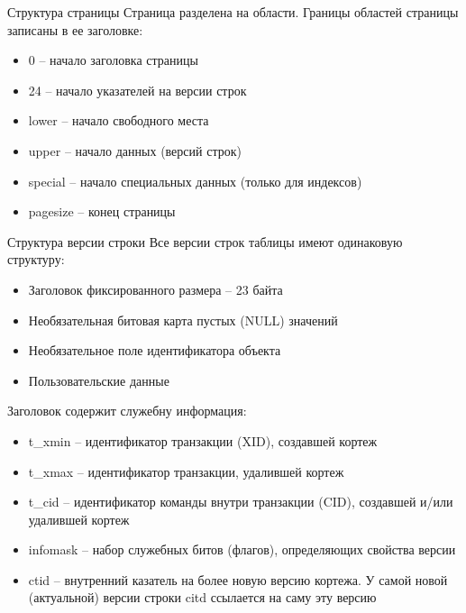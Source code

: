 \documentclass[12pt]{article}
\begin{document}
\begin{nota}{Структура страницы}
    Страница разделена на области. Границы областей страницы записаны в ее заголовке:

    \begin{itemize}
        \item 0 -- начало заголовка страницы 
        \item 24 -- начало указателей на версии строк 
        \item lower -- начало свободного места 
        \item upper -- начало данных (версий строк)
        \item special -- начало специальных данных (только для индексов)
        \item pagesize -- конец страницы
    \end{itemize}
\end{nota}

\begin{nota}{Структура версии строки}
    Все версии строк таблицы имеют одинаковую структуру: 

    \begin{itemize}
        \item Заголовок фиксированного размера -- 23 байта 
        \item Необязательная битовая карта пустых (NULL) значений 
        \item Необязательное поле идентификатора объекта 
        \item Пользовательские данные 
    \end{itemize}

    Заголовок содержит служебну информация:

    \begin{itemize}
        \item t\_xmin -- идентификатор транзакции (XID), создавшей кортеж 
        \item t\_xmax -- идентификатор транзакции, удалившей кортеж
        \item t\_cid -- идентификатор команды внутри транзакции (CID), создавшей и/или удалившей кортеж 
        \item infomask -- набор служебных битов (флагов), определяющих свойства версии 
        \item ctid -- внутренний казатель на более новую версию кортежа. У самой новой (актуальной) версии строки citd ссылается на саму эту версию 
    \end{itemize}
\end{nota}
\end{document}
